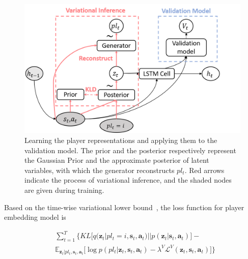 \documentclass[letterpaper]{article} %
\newcommand{\expect}{\mathbb{E}}
\newcommand{\latentvariables}{\mathbf{z}}
\newcommand{\inference}{q}
\newcommand{\generation}{p}
\newcommand{\state}{\mathbf{s}}
\newcommand{\action}{\mathbf{a}}
\newcommand{\player}{pl}
\newcommand{\pindex}{i}
\newcommand{\prior}{p}
\begin{document}
\begin{figure}[htbp]
    \centering
    \includegraphics[width=1\columnwidth] 
    {./figures/cvrnn_structure.png}
    \caption{Learning the player representations and applying them to the validation model. The prior and the posterior respectively represent the Gaussian Prior and the approximate posterior of latent variables, with which the generator reconstructs $\player_{t}$. Red arrows indicate the process of variational inference, and the shaded nodes are given during training.
    } 
    \label{fig:model-struct}
\end{figure} 

Based on the time-wise variational lower bound~\cite{ChungKDGCB15}, the loss function for player embedding model is

\begin{align} \label{eq:loss}
        &\sum_{t=1}^{T}\Big\{ KL\Big[\inference(\latentvariables_{t} |\player_{t} = \pindex,\state_{t},\action_{t})||\prior(\latentvariables_{t}|\state_{t},\action_{t})\Big]-\\
        &\expect_{\latentvariables_{t}|\player_{t},\state_{t},\action_{t}}
        \Big[\log\generation(\player_{t}|\latentvariables_{t},\state_{t},\action_{t}) -\lambda^{V}
        \mathcal{L}^{V}( \latentvariables_{t},\state_{t},\action_{t})\Big]
        \Big\} \nonumber
\end{align}
\end{document}
